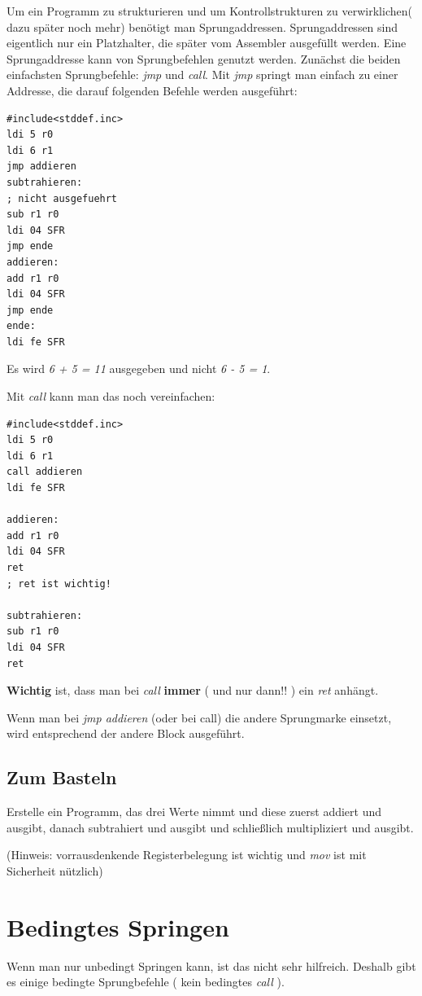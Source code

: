 \documentclass[a4paper,12pt,oneside]{scrreprt}
\begin{document}
Um ein Programm zu strukturieren und um Kontrollstrukturen zu verwirklichen( dazu später noch mehr) benötigt man Sprungaddressen.  
Sprungaddressen sind eigentlich nur ein Platzhalter, die später vom Assembler ausgefüllt werden.
Eine Sprungaddresse kann von Sprungbefehlen genutzt werden. Zunächst die beiden einfachsten Sprungbefehle: \textit{jmp} und \textit{call}.
Mit \textit{jmp} springt man einfach zu einer Addresse, die darauf folgenden Befehle werden ausgeführt:

\begin{lstlisting}[frame=single]
#include<stddef.inc>
ldi 5 r0
ldi 6 r1
jmp addieren
subtrahieren:
; nicht ausgefuehrt
sub r1 r0
ldi 04 SFR
jmp ende
addieren:
add r1 r0
ldi 04 SFR
jmp ende
ende:
ldi fe SFR
\end{lstlisting}

Es wird \textit{6 + 5 = 11} ausgegeben und nicht \textit{6 - 5 = 1}.

Mit \textit{call} kann man das noch vereinfachen:

\begin{lstlisting}[frame=single]
#include<stddef.inc>
ldi 5 r0
ldi 6 r1
call addieren
ldi fe SFR

addieren:
add r1 r0
ldi 04 SFR
ret
; ret ist wichtig!

subtrahieren:
sub r1 r0
ldi 04 SFR
ret
\end{lstlisting}

\textbf{Wichtig} ist, dass man bei \textit{call} \textbf{immer} ( und nur dann!! )  ein \textit{ret} anhängt.

Wenn man bei \textit{jmp addieren} (oder bei call) die andere Sprungmarke einsetzt, wird entsprechend der andere Block ausgeführt.

\subsection{Zum Basteln}

Erstelle ein Programm, das drei Werte nimmt und diese zuerst addiert und ausgibt, danach subtrahiert und ausgibt und schließlich multipliziert und ausgibt.

(Hinweis: vorrausdenkende Registerbelegung ist wichtig und \textit{mov} ist mit Sicherheit nützlich)

\section{Bedingtes Springen}

Wenn man nur unbedingt Springen kann, ist das nicht sehr hilfreich. Deshalb gibt es einige bedingte Sprungbefehle ( kein bedingtes \textit{call} ). 
\end{document}
